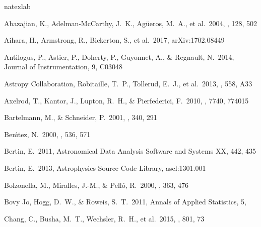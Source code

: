 \documentclass[useamsfonts]{pasj01}
\begin{document}
\begin{thebibliography}{}
    \label{sec:ref}
    \expandafter\ifx\csname natexlab\endcsname\relax\def\natexlab#1{#1}\fi
    
     Abazajian, K., Adelman-McCarthy, 
             J.~K., Ag{\"u}eros, M.~A., et al.\ 2004, \aj, 128, 502 
             
     Aihara, H., Armstrong, R., Bickerton, S., 
             et al.\ 2017, arXiv:1702.08449 
    
     Antilogus, P., Astier, P., 
             Doherty, P., Guyonnet, A., \& Regnault, N.\ 2014, Journal of 
             Instrumentation, 9, C03048 
    
     Astropy Collaboration, 
             Robitaille, T.~P., Tollerud, E.~J., et al.\ 2013, \aap, 558, A33 
             
     Axelrod, T., Kantor, J., Lupton, 
             R.~H., \& Pierfederici, F.\ 2010, \procspie, 7740, 774015 
             
     Bartelmann, M., \& 
             Schneider, P.\ 2001, \physrep, 340, 291 
      
     Ben{\'{\i}}tez, N.\ 2000, \apj, 
             536, 571         
     
     Bertin, E.\ 2011, Astronomical Data Analysis 
             Software and Systems XX, 442, 435 
    
     Bertin, E.\ 2013, Astrophysics Source 
             Code Library, ascl:1301.001 
     
     Bolzonella, M., Miralles, J.-M., 
            \& Pell{\'o}, R.\ 2000, \aap, 363, 476 
            
     Bovy Jo, Hogg, D.~W., \& Roweis, 
             S.~T.\ 2011, Annals of Applied Statistics, 5,  
    
     Chang, C., Busha, M.~T., Wechsler, R.~H., 
             et al.\ 2015, \apj, 801, 73 


\end{thebibliography}
\end{document}
